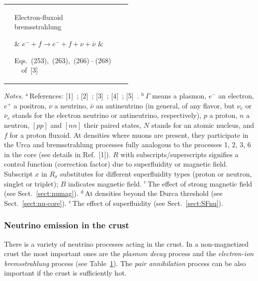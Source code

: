 \documentclass[smallextended]{svjour3}       %
\begin{document}
\begin{table}[t]
\begin{center}
\begin{tabular}{llll}
 & \parbox[c]{3.4cm}{Electron-fluxoid \\ bremsstrahlung}
  & $e^- + f \to e^- + f +\nu+\bar\nu$
          & \parbox[c]{28ex}{\mbox{Eqs.~(253), (263), (266)\,--\,(268)} \\
                \mbox{ \,\,\,of [3]}} \\ [2ex]
  \hline \hline
  \end{tabular}
\end{center}
\textit{Notes.}
{}$^\mathrm{a}$\,References:
[1]~\citet{KantorGusakov07};
[2]~\citet{OfengeimKY14};  
[3]~\citet{YKGH01};
[4]~\citet{Gusakov02};
[5]~\citet{Leinson09,Leinson10}.\hspace*{1ex}
{}$^\mathrm{b}$\,$\Gamma$ means a plasmon, $e^-$ an electron,
$e^+$ a positron, $\nu$ a neutrino, $\bar{\nu}$ an
antineutrino (in general, of any flavor, but
$\nu_e$ or $\bar\nu_e$ stands
for the electron neutrino or antineutrino,
respectively), $p$ a proton, $n$ a neutron, $[pp]$ and $[nn]$
their paired states, $N$ stands
for an atomic nucleus, and $f$ for a proton fluxoid.
At densities where muons are present, they participate in
the Urca and bremsstrahlung processes fully analogous to the
processes 1, 2, 3, 6 in the core (see details in Ref.~[1]).
$R$ with subscripts/superscripts signifies a control function
(correction factor) due to superfluidity or magnetic field.
Subscript $x$ in $R_x$ substitutes for different 
 superfluidity types (proton or neutron, singlet or
triplet); $B$ indicates magnetic field.\hspace*{1ex}
{}$^\mathrm{c}$\,The effect of strong magnetic field
(see Sect.~\ref{sect:numag}).\hspace*{1ex}
{}$^\mathrm{d}$\,At densities beyond the Durca threshold 
(see Sect.~\ref{sect:nu-core}).\hspace*{1ex}
{}$^\mathrm{e}$\,The effect of
superfluidity (see Sect.~\ref{sect:SFnu}).
\label{tab:nu}
\end{table}


\subsubsection{Neutrino emission in the crust}
\label{sect:nu-crust}

There is a variety of neutrino processes acting in the
crust. In a non-magnetized crust the most important ones are
the \emph{plasmon decay} process and the \emph{electron-ion
bremsstrahlung} process (see Table~\ref{tab:nu}). The
\emph{pair annihilation} process can be also important if
the crust is sufficiently hot.
\end{document}

